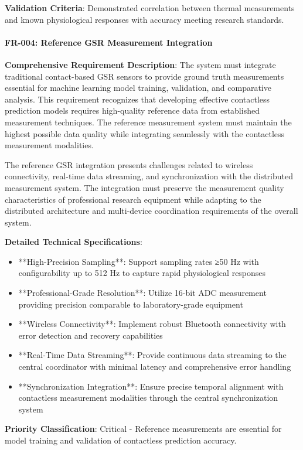 \documentclass[12pt,a4paper]{article}
\begin{document}
\textbf{Validation Criteria}: Demonstrated correlation between thermal measurements and known physiological responses with
accuracy meeting research standards.

\paragraph{FR-004: Reference GSR Measurement Integration}

\textbf{Comprehensive Requirement Description}: The system must integrate traditional contact-based GSR sensors to provide
ground truth measurements essential for machine learning model training, validation, and comparative analysis. This
requirement recognizes that developing effective contactless prediction models requires high-quality reference data from
established measurement techniques. The reference measurement system must maintain the highest possible data quality
while integrating seamlessly with the contactless measurement modalities.

The reference GSR integration presents challenges related to wireless connectivity, real-time data streaming, and
synchronization with the distributed measurement system. The integration must preserve the measurement quality
characteristics of professional research equipment while adapting to the distributed architecture and multi-device
coordination requirements of the overall system.

\textbf{Detailed Technical Specifications}:

\begin{itemize}
\item **High-Precision Sampling**: Support sampling rates ≥50 Hz with configurability up to 512 Hz to capture rapid
  physiological responses
\item **Professional-Grade Resolution**: Utilize 16-bit ADC measurement providing precision comparable to laboratory-grade
  equipment
\item **Wireless Connectivity**: Implement robust Bluetooth connectivity with error detection and recovery capabilities
\item **Real-Time Data Streaming**: Provide continuous data streaming to the central coordinator with minimal latency and
  comprehensive error handling
\item **Synchronization Integration**: Ensure precise temporal alignment with contactless measurement modalities through the
  central synchronization system

\end{itemize}
\textbf{Priority Classification}: Critical - Reference measurements are essential for model training and validation of
contactless prediction accuracy.
\end{document}
